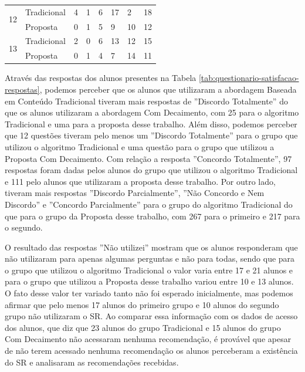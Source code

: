 \begin{table}[h]
\begin{tabular}{|p{1.5cm}|p{1.8cm}|p{2.2cm}|p{0.6cm}|p{0.6cm}|p{0.6cm}|p{2.3cm}|p{2cm}|}
\hline
\multirow{2}{*}{12}         & Tradicional & 4                   & 1                     & 6                         & 17                    & 2                   & 18           \\
                            & Proposta    & 0                   & 1                     & 5                         & 9                     & 10                  & 12           \\
\hline
\multirow{2}{*}{13}         & Tradicional & 2                   & 0                     & 6                         & 13                    & 12                  & 15           \\
                            & Proposta    & 0                   & 1                     & 4                         & 7                     & 14                  & 11           \\
\hline
\end{tabular}
\end{table}

Através das respostas dos alunos presentes na Tabela \ref{tab:questionario-satisfacao-respostas}, podemos perceber que
os alunos que utilizaram a abordagem Baseada em Conteúdo Tradicional tiveram mais respostas de ''Discordo Totalmente'' do
que os alunos utilizaram a abordagem Com Decaimento, com 25 para o algoritmo Tradicional e uma para a proposta desse trabalho.
Além disso, podemos perceber que 12 questões tiveram pelo menos um ''Discordo Totalmente'' para o grupo que utilizou o algoritmo
Tradicional e uma questão para o grupo que utilizou a Proposta Com Decaimento. Com relação a resposta ''Concordo Totalmente'',
97 respostas foram dadas pelos alunos do grupo que utilizou o algoritmo Tradicional e 111
pelo alunos que utilizaram a proposta desse trabalho. Por outro lado, tiveram mais respostas ''Discordo Parcialmente'',
''Não Concordo e Nem Discordo'' e ''Concordo Parcialmente'' para o grupo do algoritmo Tradicional do que para o grupo da
Proposta desse trabalho, com 267 para o primeiro e 217 para o segundo.

O resultado das respostas ''Não utilizei'' mostram que os alunos responderam que não utilizaram para apenas algumas perguntas e não para todas, sendo que para o grupo
que utilizou o algoritmo Tradicional o valor varia entre 17 e 21 alunos e para o grupo que utilizou a Proposta desse
trabalho variou entre 10 e 13 alunos. O fato desse valor ter variado tanto não foi esperado inicialmente, mas podemos
afirmar que pelo menos 17 alunos do primeiro grupo e 10 alunos do segundo grupo não utilizaram o SR. Ao comparar essa
informação com os dados de acesso dos alunos, que diz que 23 alunos do grupo Tradicional e 15 alunos do grupo Com
Decaimento não acessaram nenhuma recomendação, é provável que apesar de não terem acessado nenhuma recomendação os
alunos perceberam a existência do SR e analisaram as recomendações recebidas.

